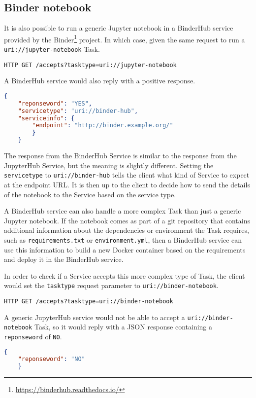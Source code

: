 \documentclass[11pt,a4paper]{ivoa}
\newcommand{\json} {JSON\xspace}
\newcommand{\docker} {Docker\xspace}
\newcommand{\binderhub} {BinderHub\xspace}
\newcommand{\jupyter} {Jupyter\xspace}
\newcommand{\jupyterhub} {JupyterHub\xspace}
\newcommand{\codeword}[1] {\texttt{#1}}
\newcommand{\footurl}[1] {\footnote{\url{#1}}}
\begin{document}
\subsection{Binder notebook}
\label{sec:uri://binder-notebook}
It is also possible to run a generic \jupyter notebook in a \binderhub service provided by the Binder\footurl{https://binderhub.readthedocs.io/} project.
In which case, given the same request to run a \codeword{uri://jupyter-notebook} Task.
\begin{lstlisting}[]
    HTTP GET /accepts?tasktype=uri://jupyter-notebook
\end{lstlisting}
A \binderhub service would also reply with a positive response.
\begin{lstlisting}[language=json]
    {
    "reponseword": "YES",
    "servicetype": "uri://binder-hub",
    "serviceinfo": {
        "endpoint": "http://binder.example.org/"
        }
    }
\end{lstlisting}
The response from the \binderhub Service is similar to the response from the \jupyterhub Service, but the meaning is slightly different.
Setting the \codeword{servicetype} to \codeword{uri://binder-hub} tells the client what kind of Service to expect at the endpoint URL.
It is then up to the client to decide how to send the details of the notebook to the Service based on the service type.

A \binderhub service can also handle a more complex Task than just a generic \jupyter notebook.
If the notebook comes as part of a git repository that contains additional information about the dependencies or environment the Task requires, such as \codeword{requirements.txt} or \codeword{environment.yml}, then a \binderhub service can use this information to build a new \docker container based on the requirements and deploy it in the \binderhub service.

In order to check if a Service accepts this more complex type of Task, the client would set the \codeword{tasktype} request parameter to \codeword{uri://binder-notebook}.
\begin{lstlisting}[]
    HTTP GET /accepts?tasktype=uri://binder-notebook
\end{lstlisting}

A generic \jupyterhub service would not be able to accept a \codeword{uri://binder-notebook} Task, so it would reply with a \json response containing a \codeword{reponseword} of \codeword{NO}.

\begin{lstlisting}[language=json]
    {
    "reponseword": "NO"
    }
\end{lstlisting}
\end{document}
